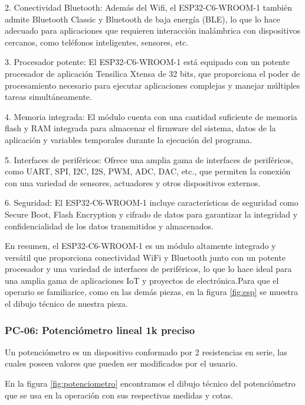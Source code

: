     2. Conectividad Bluetooth: Además del Wifi, el ESP32-C6-WROOM-1 también admite Bluetooth Classic y Bluetooth de baja energía (BLE), lo que lo hace adecuado para aplicaciones que requieren interacción inalámbrica con dispositivos cercanos, como teléfonos inteligentes, sensores, etc.
    
    3. Procesador potente: El ESP32-C6-WROOM-1 está equipado con un potente procesador de aplicación Tensilica Xtensa de 32 bits, que proporciona el poder de procesamiento necesario para ejecutar aplicaciones complejas y manejar múltiples tareas simultáneamente.
    
    4. Memoria integrada: El módulo cuenta con una cantidad suficiente de memoria flash y RAM integrada para almacenar el firmware del sistema, datos de la aplicación y variables temporales durante la ejecución del programa.
    
    5. Interfaces de periféricos: Ofrece una amplia gama de interfaces de periféricos, como UART, SPI, I2C, I2S, PWM, ADC, DAC, etc., que permiten la conexión con una variedad de sensores, actuadores y otros dispositivos externos.
    
    6. Seguridad: El ESP32-C6-WROOM-1 incluye características de seguridad como Secure Boot, Flash Encryption y cifrado de datos para garantizar la integridad y confidencialidad de los datos transmitidos y almacenados.
    
    En resumen, el ESP32-C6-WROOM-1 es un módulo altamente integrado y versátil que proporciona conectividad WiFi y Bluetooth junto con un potente procesador y una variedad de interfaces de periféricos, lo que lo hace ideal para una amplia gama de aplicaciones IoT y proyectos de electrónica.Para que el operario se familiarice, como en las demás piezas, en la figura \ref{fig:esp} se muestra el dibujo técnico de nuestra pieza.
    
    
    
    \subsubsection{PC-06: Potenciómetro lineal 1k preciso }
    
    Un potenciómetro es un dispositivo conformado por 2 resistencias en serie, las cuales poseen valores que pueden ser modificados por el usuario. 
    
    En la figura \ref{fig:potenciometro} encontramos el dibujo técnico del potenciómetro que se usa en la operación con sus respectivas medidas y cotas.
    
